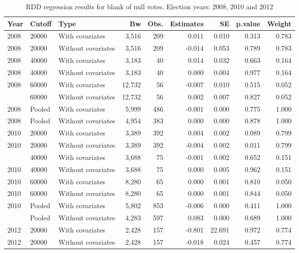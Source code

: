 \documentclass[12pt,]{article}
\begin{document}
\begin{table}[!h]

\caption{\label{tab:r.pct.bn}RDD regression results for blank of null votes. Election years: 2008, 2010 and 2012}
\centering
\begin{tabular}{lllrrrrrr}
\toprule
Year & Cutoff & Type & Bw & Obs. & Estimates & SE & p.value & Weight\\
\midrule
2008 & 20000 & With covariates & 3,516 & 209 & 0.011 & 0.010 & 0.313 & 0.783\\
2008 & 20000 & Without covariates & 3,516 & 209 & -0.014 & 0.053 & 0.789 & 0.783\\
2008 & 40000 & With covariates & 3,183 & 40 & 0.014 & 0.032 & 0.663 & 0.164\\
2008 & 40000 & Without covariates & 3,183 & 40 & 0.000 & 0.004 & 0.977 & 0.164\\
2008 & 60000 & With covariates & 12,732 & 56 & -0.007 & 0.010 & 0.515 & 0.052\\
\addlinespace
2008 & 60000 & Without covariates & 12,732 & 56 & 0.002 & 0.007 & 0.827 & 0.052\\
2008 & Pooled & With covariates & 5,999 & 486 & -0.001 & 0.000 & 0.775 & 1.000\\
2008 & Pooled & Without covariates & 4,954 & 383 & 0.000 & 0.000 & 0.878 & 1.000\\
2010 & 20000 & With covariates & 3,389 & 392 & 0.004 & 0.002 & 0.089 & 0.799\\
2010 & 20000 & Without covariates & 3,389 & 392 & -0.004 & 0.002 & 0.011 & 0.799\\
\addlinespace
2010 & 40000 & With covariates & 3,688 & 75 & -0.001 & 0.002 & 0.652 & 0.151\\
2010 & 40000 & Without covariates & 3,688 & 75 & 0.000 & 0.005 & 0.962 & 0.151\\
2010 & 60000 & With covariates & 8,280 & 65 & 0.000 & 0.001 & 0.810 & 0.050\\
2010 & 60000 & Without covariates & 8,280 & 65 & 0.000 & 0.001 & 0.844 & 0.050\\
2010 & Pooled & With covariates & 5,802 & 853 & -0.006 & 0.000 & 0.411 & 1.000\\
\addlinespace
2010 & Pooled & Without covariates & 4,283 & 597 & 0.083 & 0.000 & 0.689 & 1.000\\
2012 & 20000 & With covariates & 2,428 & 157 & -0.801 & 22.691 & 0.972 & 0.774\\
2012 & 20000 & Without covariates & 2,428 & 157 & -0.018 & 0.024 & 0.457 & 0.774\\

\end{tabular}
\end{table}
\end{document}
